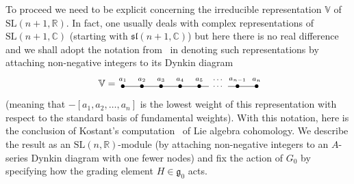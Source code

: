 To proceed we need to be explicit concerning the irreducible representation
${\mathbb{V}}$ of ${\mathrm{SL}}(n+1,{\mathbb{R}})$. In fact, one usually deals
with complex representations of ${\mathrm{SL}}(n+1,{\mathbb{C}})$ (starting
with ${\mathfrak{sl}}(n+1,{\mathbb{C}})$) but here there is no real dif\/ference
and we shall adopt the notation from~\cite{beastwood} in denoting such
representations by attaching non-negative integers to its Dynkin diagram
\[{\mathbb{V}}=\enskip\raisebox{-5pt}{\begin{picture}(140,17)
\put(0,5){\makebox(0,0){$\bullet$}}
\put(20,5){\makebox(0,0){$\bullet$}}
\put(40,5){\makebox(0,0){$\bullet$}}
\put(60,5){\makebox(0,0){$\bullet$}}
\put(80,5){\makebox(0,0){$\bullet$}}
\put(120,5){\makebox(0,0){$\bullet$}}
\put(140,5){\makebox(0,0){$\bullet$}}
\put(0,5){\line(1,0){90}}
\put(100,5){\makebox(0,0){\scriptsize$\cdots$}}
\put(110,5){\line(1,0){30}}
\put(0,12){\makebox(0,0){\scriptsize$a_1$}}
\put(20,12){\makebox(0,0){\scriptsize$a_2$}}
\put(40,12){\makebox(0,0){\scriptsize$a_3$}}
\put(60,12){\makebox(0,0){\scriptsize$a_4$}}
\put(80,12){\makebox(0,0){\scriptsize$a_5$}}
\put(100,12){\makebox(0,0){\scriptsize$\cdots$}}
\put(120,12){\makebox(0,0){\scriptsize$a_{n-1}$}}
\put(140,12){\makebox(0,0){\scriptsize$a_n$}}
\end{picture}}\]
(meaning that $-[a_1,a_2,\dots,a_n]$ is the lowest weight of this
representation with respect to the standard basis of fundamental weights).
With this notation, here is the conclusion of Kostant's computation~\cite{k}
of Lie algebra cohomology. We describe the result as an
${\mathrm{SL}}(n,{\mathbb{R}})$-module (by attaching non-negative integers to
an $A$-series Dynkin diagram with one fewer nodes) and f\/ix the action of $G_0$
by specifying how the grading element $H\in{\mathfrak{g}}_0$ acts.
